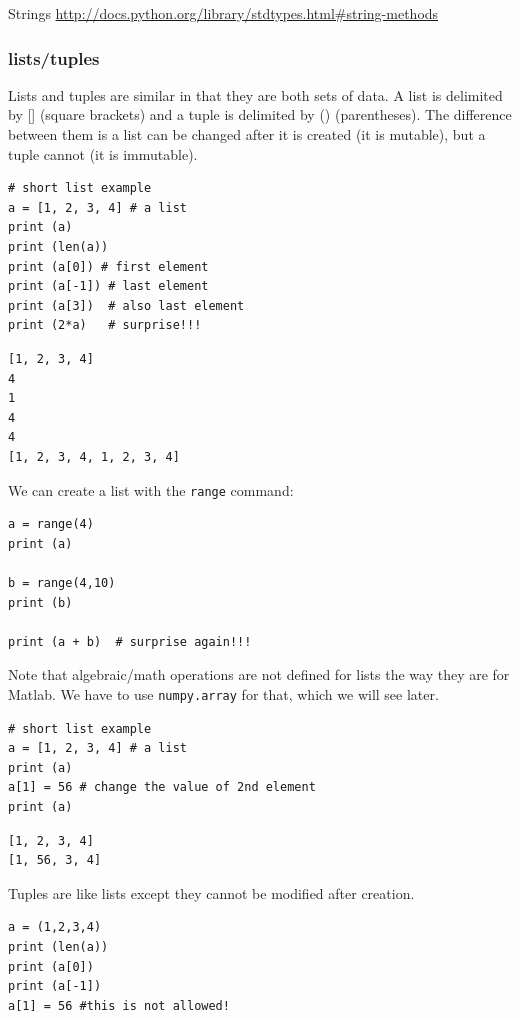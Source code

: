 \documentclass[11pt]{article}
\begin{document}
Strings \url{http://docs.python.org/library/stdtypes.html\#string-methods}


\subsubsection{lists/tuples}
\label{sec:orge4f2f9b}

Lists and tuples are similar in that they are both sets of data. A list is delimited by [] (square brackets) and a tuple is delimited by () (parentheses). The difference between them is a list can be changed after it is created (it is mutable), but a tuple cannot (it is immutable).

\begin{verbatim}
# short list example
a = [1, 2, 3, 4] # a list
print (a)
print (len(a))
print (a[0]) # first element
print (a[-1]) # last element
print (a[3])  # also last element
print (2*a)   # surprise!!!
\end{verbatim}

\begin{verbatim}
[1, 2, 3, 4]
4
1
4
4
[1, 2, 3, 4, 1, 2, 3, 4]
\end{verbatim}

We can create a list with the \texttt{range} command:

\begin{verbatim}
a = range(4)
print (a)

b = range(4,10)
print (b)

print (a + b)  # surprise again!!!
\end{verbatim}

Note that algebraic/math operations are not defined for lists the way they are for Matlab. We have to use \texttt{numpy.array} for that, which we will see later.

\begin{verbatim}
# short list example
a = [1, 2, 3, 4] # a list
print (a)
a[1] = 56 # change the value of 2nd element
print (a)
\end{verbatim}

\begin{verbatim}
[1, 2, 3, 4]
[1, 56, 3, 4]
\end{verbatim}

Tuples are like lists except they cannot be modified after creation.

\begin{verbatim}
a = (1,2,3,4)
print (len(a))
print (a[0])
print (a[-1])
a[1] = 56 #this is not allowed!
\end{verbatim}
\end{document}
